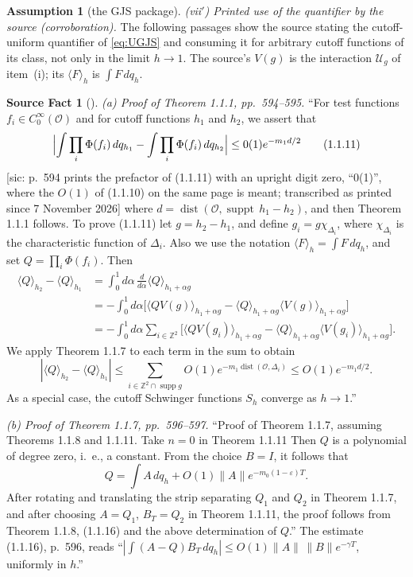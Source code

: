 \documentclass[11pt,a4paper]{article}
\theoremstyle{plain}
\theoremstyle{definition}
\newtheorem*{srcfactstar}{Source Fact}
\newtheorem{assumption}{Assumption}
\theoremstyle{plain}
\theoremstyle{definition}
\begin{document}
\begin{assumption}[the GJS package]
\emph{(vii$'$) Printed use of the quantifier by the source (corroboration).}  The following
passages show the source stating the cutoff-uniform quantifier of \eqref{eq:UGJS} and
consuming it for arbitrary cutoff functions of its class, not only in the limit $h\to1$.  The
source's $V(g)$ is the interaction $\mathcal U_g$ of item~(i); its
$\langle F\rangle_h$ is $\int F\,dq_h$.
\begin{srcfactstar}[{\cite[pp.~594--597 and 629]{GJS}}]
\emph{(a) Proof of Theorem 1.1.1, pp.~594--595.}  ``For test functions
$f_i\in C_0^\infty(\mathcal O)$ and for cutoff functions $h_1$ and $h_2$, we assert that
\[
 \Bigl|\int\prod_i\Phi(f_i)\,dq_{h_1}-\int\prod_i\Phi(f_i)\,dq_{h_2}\Bigr|
 \le 0(1)e^{-m_1d/2}
 \tag{1.1.11}
\]
[sic: p.~594 prints the prefactor of (1.1.11) with an upright digit zero, ``0(1)'', where
the $O(1)$ of (1.1.10) on the same page is meant; transcribed as printed since 7 November
2026] where $d=\operatorname{dist}(\mathcal O,\operatorname{suppt}\,h_1-h_2)$, and then
Theorem 1.1.1 follows.  To prove (1.1.11) let $g=h_2-h_1$, and define
$g_i=g\chi_{\Delta_i}$, where $\chi_{\Delta_i}$ is the characteristic function of
$\Delta_i$.  Also we use the notation $\langle F\rangle_h=\int F\,dq_h$, and set
$Q=\prod_i\Phi(f_i)$.  Then
\begin{align*}
 \langle Q\rangle_{h_2}-\langle Q\rangle_{h_1}
 &=\int_0^1d\alpha\,\frac{d}{d\alpha}\langle Q\rangle_{h_1+\alpha g}\\
 &=-\int_0^1d\alpha\bigl[\langle QV(g)\rangle_{h_1+\alpha g}
   -\langle Q\rangle_{h_1+\alpha g}\langle V(g)\rangle_{h_1+\alpha g}\bigr]
 \tag{1.1.12}\\
 &=-\int_0^1d\alpha\sum_{i\in\mathbb Z^2}\bigl[\langle QV(g_i)\rangle_{h_1+\alpha g}
   -\langle Q\rangle_{h_1+\alpha g}\langle V(g_i)\rangle_{h_1+\alpha g}\bigr] .
\end{align*}
We apply Theorem 1.1.7 to each term in the sum to obtain
\[
 |\langle Q\rangle_{h_2}-\langle Q\rangle_{h_1}|
 \le\sum_{i\in\mathbb Z^2\cap\operatorname{supp}g}
 O(1)e^{-m_1\operatorname{dist}(\mathcal O,\Delta_i)}
 \le O(1)e^{-m_1d/2} .
\]
As a special case, the cutoff Schwinger functions $S_h$ converge as $h\to1$.''

\emph{(b) Proof of Theorem 1.1.7, pp.~596--597.}  ``Proof of Theorem 1.1.7, assuming
Theorems 1.1.8 and 1.1.11.  Take $n=0$ in Theorem 1.1.11 Then $Q$ is a polynomial of
degree zero, i.\ e., a constant.  From the choice $B=I$, it follows that
\[
 Q=\int A\,dq_h+O(1)\|A\|e^{-m_0(1-\varepsilon)T} .
\]
After rotating and translating the strip separating $Q_1$ and $Q_2$ in Theorem 1.1.7,
and after choosing $A=Q_1$, $B_T=Q_2$ in Theorem 1.1.11, the proof follows from Theorem
1.1.8, (1.1.16) and the above determination of $Q$.''  The estimate (1.1.16), p.~596,
reads ``$|\int(A-Q)B_T\,dq_h|\le O(1)\|A\|\,\|B\|e^{-\gamma T}$, uniformly in $h$.''


\end{srcfactstar}
\end{assumption}
\end{document}
